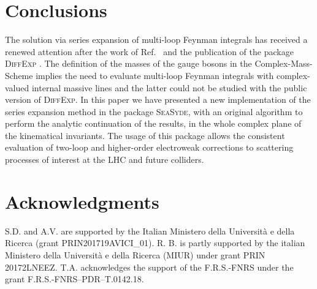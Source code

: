 \section{Conclusions}
\label{sec:conclusion}
The solution via series expansion of multi-loop Feynman integrals has received a renewed attention after the work of Ref.~\cite{Moriello:2019yhu} and the publication of the package \textsc{DiffExp} \cite{Hidding:2020ytt}.
The definition of the masses of the gauge bosons in the Complex-Mass-Scheme implies the need to evaluate multi-loop Feynman integrals with complex-valued internal massive lines and the latter could not be studied with the public version of \textsc{DiffExp}.
In this paper we have presented a new implementation of the series expansion method in the package \textsc{SeaSyde}, with an original algorithm to perform the analytic continuation of the results, in the whole complex plane of the kinematical invariants.
The usage of this package allows the consistent evaluation of two-loop and higher-order electroweak corrections to scattering processes of interest at the LHC and future colliders.




\section*{Acknowledgments}
S.D. and A.V. are supported by the Italian Ministero della Universit\`a e della Ricerca (grant PRIN201719AVICI\_01).
R. B. is partly supported by the italian Ministero della Universit\`a e della Ricerca (MIUR) under grant PRIN 20172LNEEZ.
T.A. acknowledges the support of the F.R.S.-FNRS under the grant F.R.S.-FNRS–PDR–T.0142.18.
